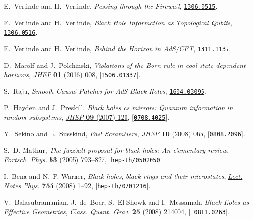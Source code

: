 \documentclass[12pt]{article}
\begin{document}
\begin{thebibliography}{100}
E.~Verlinde and H.~Verlinde, \emph{{Passing through the Firewall}},
  \href{http://arxiv.org/abs/1306.0515}{{\tt 1306.0515}}.

E.~Verlinde and H.~Verlinde, \emph{{Black Hole Information as Topological
  Qubits}},  \href{http://arxiv.org/abs/1306.0516}{{\tt 1306.0516}}.

E.~Verlinde and H.~Verlinde, \emph{{Behind the Horizon in AdS/CFT}},
  \href{http://arxiv.org/abs/1311.1137}{{\tt 1311.1137}}.

D.~Marolf and J.~Polchinski, \emph{{Violations of the Born rule in cool
  state-dependent horizons}},
  \href{http://dx.doi.org/10.1007/JHEP01(2016)008}{\emph{JHEP} {\bf 01} (2016)
  008}, [\href{http://arxiv.org/abs/1506.01337}{{\tt 1506.01337}}].

S.~Raju, \emph{{Smooth Causal Patches for AdS Black Holes}},
  \href{http://arxiv.org/abs/1604.03095}{{\tt 1604.03095}}.

P.~Hayden and J.~Preskill, \emph{{Black holes as mirrors: Quantum information
  in random subsystems}},
  \href{http://dx.doi.org/10.1088/1126-6708/2007/09/120}{\emph{JHEP} {\bf 09}
  (2007) 120}, [\href{http://arxiv.org/abs/0708.4025}{{\tt 0708.4025}}].

Y.~Sekino and L.~Susskind, \emph{{Fast Scramblers}},
  \href{http://dx.doi.org/10.1088/1126-6708/2008/10/065}{\emph{JHEP} {\bf 10}
  (2008) 065}, [\href{http://arxiv.org/abs/0808.2096}{{\tt 0808.2096}}].

S.~D. Mathur, \emph{{The fuzzball proposal for black holes: An elementary
  review}}, \href{http://dx.doi.org/10.1002/prop.200410203}{\emph{Fortsch.
  Phys.} {\bf 53} (2005) 793--827},
  [\href{http://arxiv.org/abs/hep-th/0502050}{{\tt hep-th/0502050}}].

I.~Bena and N.~P. Warner, \emph{{Black holes, black rings and their
  microstates}}, \href{http://dx.doi.org/10.1007/978-3-540-79523-0}{\emph{Lect.
  Notes Phys.} {\bf 755} (2008) 1--92},
  [\href{http://arxiv.org/abs/hep-th/0701216}{{\tt hep-th/0701216}}].

V.~Balasubramanian, J.~de~Boer, S.~El-Showk and I.~Messamah, \emph{{Black Holes
  as Effective Geometries}},
  \href{http://dx.doi.org/10.1088/0264-9381/25/21/214004}{\emph{Class. Quant.
  Grav.} {\bf 25} (2008) 214004}, [\href{http://arxiv.org/abs/0811.0263}{{\tt
  0811.0263}}].


\end{thebibliography}
\end{document}

